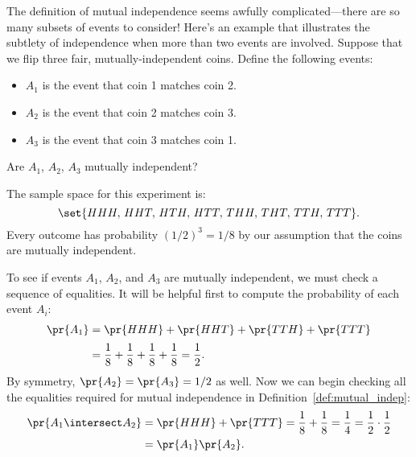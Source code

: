The definition of mutual independence seems awfully
complicated---there are so many subsets of events to consider!  Here's
an example that illustrates the subtlety of independence when more
than two events are involved.
Suppose that we flip three fair, mutually-independent coins.  Define
the following events:
%
\begin{itemize}
\item $A_1$ is the event that coin 1 matches coin 2.
\item $A_2$ is the event that coin 2 matches coin 3.
\item $A_3$ is the event that coin 3 matches coin 1.
\end{itemize}
%
Are $A_1$, $A_2$, $A_3$ mutually independent?

The sample space for this experiment is:
%
\[
    \set{HHH,\, HHT,\, HTH,\, HTT,\, THH,\, THT,\, TTH,\, TTT}.
\]
%
Every outcome has probability $(1/2)^3 = 1/8$ by our assumption that
the coins are mutually independent.

To see if events $A_1$, $A_2$, and $A_3$ are mutually independent, we
must check a sequence of equalities.  It will be helpful first to
compute the probability of each event $A_i$:
%
\begin{align*}
\pr{A_1} & = \pr{HHH} + \pr{HHT} + \pr{TTH} + \pr{TTT} \\[2pt]
         & = \frac{1}{8} + \frac{1}{8} + \frac{1}{8} + \frac{1}{8}%
          = \frac{1}{2}.
\end{align*}
%
By symmetry, $\pr{A_2} = \pr{A_3} = 1/2$ as well.  Now we can begin
checking all the equalities required for mutual independence in
Definition~\ref{def:mutual_indep}:
\begin{align*}
\pr{A_1 \intersect A_2}
       & = \pr{HHH} + \pr{TTT}
         = \frac{1}{8} + \frac{1}{8}
         = \frac{1}{4}
         = \frac{1}{2} \cdot \frac{1}{2}\\
       & = \pr{A_1} \pr{A_2}.
\end{align*}

\iffalse
\begin{align*}
\pr{A_1 \intersect A_2}
	& = \pr{HHH} + \pr{TTT} \\[2pt]
        & = \frac{1}{8} + \frac{1}{8} \\[2pt]
        & = \frac{1}{4} \\[2pt]
        & = \frac{1}{2} \cdot \frac{1}{2}\\[2pt]
        & = \pr{A_1} \pr{A_2}.
\end{align*}\fi

